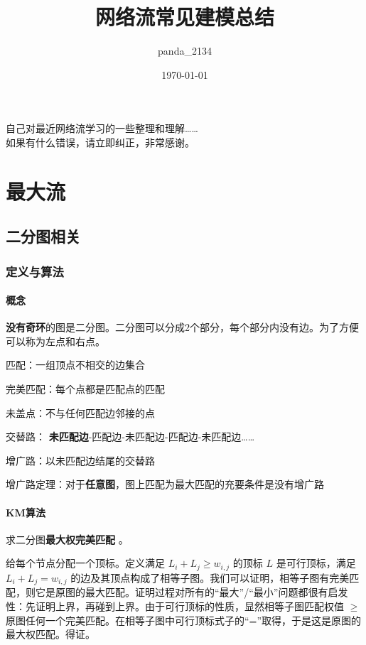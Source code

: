 \documentclass[]{ctexart}
\title{网络流常见建模总结}
\author{panda\_2134}
\date{\today}
\let\oldparagraph\paragraph
\renewcommand{\paragraph}[1]{\oldparagraph{#1}\mbox{}}
\begin{document}
\maketitle

自己对最近网络流学习的一些整理和理解\ldots{}\ldots{} \\

如果有什么错误，请立即纠正，非常感谢。

\newpage
\tableofcontents
\newpage


\hypertarget{header-n365}{%
\section{最大流}\label{header-n365}}

\hypertarget{header-n366}{%
\subsection{二分图相关}\label{header-n366}}

\hypertarget{header-n367}{%
\subsubsection{定义与算法}\label{header-n367}}

\hypertarget{header-n368}{%
\paragraph{概念}\label{header-n368}}

\textbf{没有奇环}的图是二分图。二分图可以分成2个部分，每个部分内没有边。为了方便可以称为左点和右点。

匹配：一组顶点不相交的边集合

完美匹配：每个点都是匹配点的匹配

未盖点：不与任何匹配边邻接的点

交替路：
\textbf{未匹配边}-匹配边-未匹配边-匹配边-未匹配边\ldots{}\ldots{}

增广路：以未匹配边结尾的交替路

增广路定理：对于\textbf{任意图}，图上匹配为最大匹配的充要条件是没有增广路

\hypertarget{header-n383}{%
\paragraph{KM算法}\label{header-n383}}

求二分图\textbf{最大权完美匹配} 。

给每个节点分配一个顶标。定义满足 \(L_i+L_j \geq w_{i, j}\) 的顶标 \(L\)
是可行顶标，满足 \(L_i+L_j = w_{i, j}\)
的边及其顶点构成了相等子图。我们可以证明，相等子图有完美匹配，则它是原图的最大匹配。证明过程对所有的``最大''/``最小''问题都很有启发性：先证明上界，再碰到上界。由于可行顶标的性质，显然相等子图匹配权值
\(\geq\)
原图任何一个完美匹配。在相等子图中可行顶标式子的``=''取得，于是这是原图的最大权匹配。得证。
\end{document}
